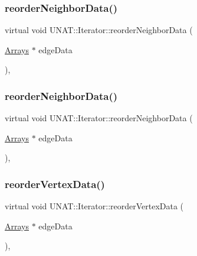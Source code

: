 \subsubsection{\texorpdfstring{reorderNeighborData()}{reorderNeighborData()}\hspace{0.1cm}{\footnotesize\ttfamily [1/2]}}
{\footnotesize\ttfamily virtual void U\+N\+A\+T\+::\+Iterator\+::reorder\+Neighbor\+Data (\begin{DoxyParamCaption}\item[{\mbox{\hyperlink{structArrays}{Arrays}} $\ast$}]{edge\+Data }\end{DoxyParamCaption})\hspace{0.3cm}{\ttfamily [inline]}, {\ttfamily [virtual]}}

\mbox{\label{classUNAT_1_1Iterator_a45d6064d872b297ff6b69f86bc7c54df}} 
\subsubsection{\texorpdfstring{reorderNeighborData()}{reorderNeighborData()}\hspace{0.1cm}{\footnotesize\ttfamily [2/2]}}
{\footnotesize\ttfamily virtual void U\+N\+A\+T\+::\+Iterator\+::reorder\+Neighbor\+Data (\begin{DoxyParamCaption}\item[{\mbox{\hyperlink{structArrays}{Arrays}} $\ast$}]{edge\+Data }\end{DoxyParamCaption})\hspace{0.3cm}{\ttfamily [inline]}, {\ttfamily [virtual]}}

\mbox{\label{classUNAT_1_1Iterator_a14c39cea873162b0232f55d73b0519ae}} 
\subsubsection{\texorpdfstring{reorderVertexData()}{reorderVertexData()}\hspace{0.1cm}{\footnotesize\ttfamily [1/2]}}
{\footnotesize\ttfamily virtual void U\+N\+A\+T\+::\+Iterator\+::reorder\+Vertex\+Data (\begin{DoxyParamCaption}\item[{\mbox{\hyperlink{structArrays}{Arrays}} $\ast$}]{edge\+Data }\end{DoxyParamCaption})\hspace{0.3cm}{\ttfamily [inline]}, {\ttfamily [virtual]}}

